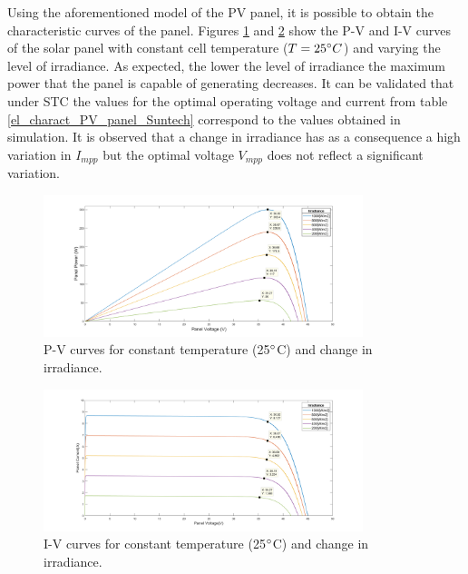 Using the aforementioned model of the PV panel, it is possible to obtain the characteristic curves of the panel. Figures \ref{fig:PVcurves_T25} and \ref{fig:IVcurves_T25} show the P-V and I-V curves of the solar panel with constant cell temperature ($T=25\dec C$) and varying the level of irradiance. 
As expected, the lower the level of irradiance the maximum power that the panel is capable of generating decreases. It can be validated that under STC the values for the optimal operating voltage and current from table \ref{el_charact_PV_panel_Suntech}  correspond to the values obtained in simulation. It is observed that a change in irradiance has as a consequence a high variation in $I_{mpp}$ but the optimal voltage $V_{mpp}$ does not reflect a significant variation. 

\begin{figure}[H]
	\begin{center}
		\includegraphics[width=0.83\textwidth]{../Pictures/PV_curves_T25degrees}
		\caption{P-V curves for constant temperature (25$\dec$C) and change in irradiance.}
		\label{fig:PVcurves_T25} 
	\end{center}	
\end{figure}

\begin{figure}[H]
	\begin{center}
		\includegraphics[width=0.83\textwidth]{../Pictures/IV_curves_T25degrees}
		\caption{I-V curves for constant temperature (25$\dec$C) and change in irradiance.}
		\label{fig:IVcurves_T25} 
	\end{center}	
\end{figure}


